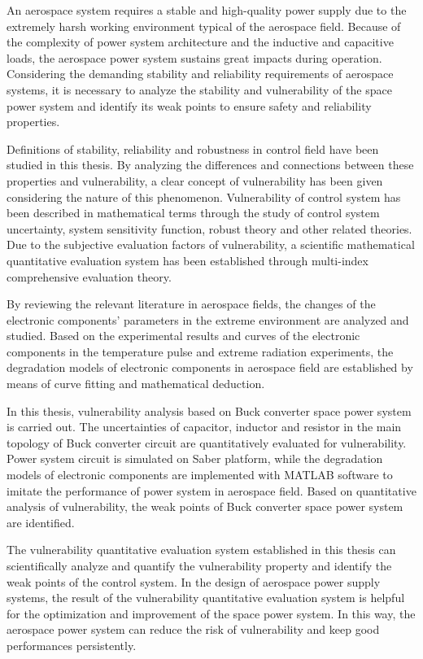 \begin{eabstract}
An aerospace system requires a stable and high-quality power supply due to the extremely harsh working environment typical of the aerospace field. Because of the complexity of power system architecture and the inductive and capacitive loads, the aerospace power system sustains great impacts during operation. Considering the demanding stability and reliability requirements of aerospace systems, it is necessary to analyze the stability and vulnerability of the space power system and identify its weak points to ensure safety and reliability properties.

Definitions of stability, reliability and robustness in control field have been studied in this thesis. By analyzing
the differences and connections between these properties and vulnerability, a clear concept of vulnerability has been given considering the nature of this phenomenon. Vulnerability of control system has been described in mathematical terms through the study of control system uncertainty, system sensitivity function, robust theory and other related theories. Due to the subjective evaluation factors of vulnerability, a scientific mathematical quantitative evaluation system has been established through multi-index comprehensive evaluation theory.

By reviewing the relevant literature in aerospace fields, the changes of the electronic components' parameters in the extreme environment are analyzed and studied. Based on the experimental results and curves of the electronic components in the temperature pulse and extreme radiation experiments, the degradation models of electronic components in aerospace field are established by means of curve fitting and mathematical deduction.

In this thesis, vulnerability analysis based on Buck converter space power system is carried out. The uncertainties of capacitor, inductor and resistor in the main topology of Buck converter circuit are quantitatively evaluated for vulnerability. Power system circuit is simulated on Saber platform, while the degradation models of electronic components are implemented with MATLAB software to imitate the performance of power system in aerospace field. Based on quantitative analysis of vulnerability, the weak points of Buck converter space power system are identified.

The vulnerability quantitative evaluation system established in this thesis can scientifically analyze and quantify the vulnerability property and identify the weak points of the control system. In the design of aerospace power supply systems, the result of the vulnerability quantitative evaluation system is helpful for the optimization and improvement of the space power system. In this way, the aerospace power system can reduce the risk of vulnerability and keep good performances persistently.
\end{eabstract}

